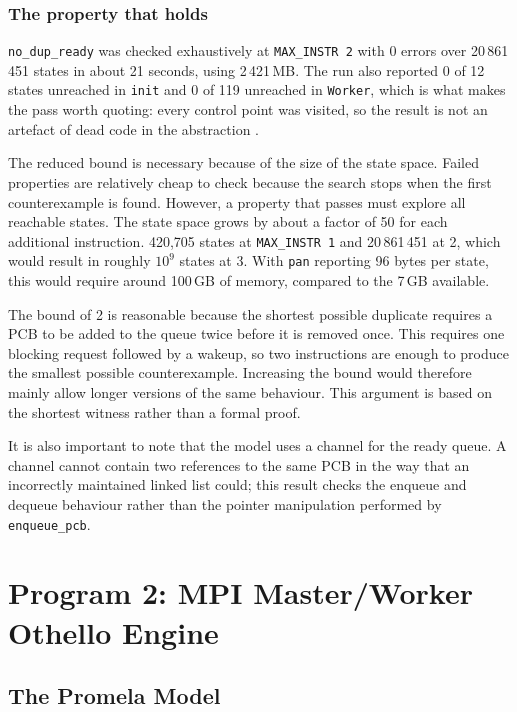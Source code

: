 \documentclass[10pt,a4paper]{article}
\newcommand{\code}[1]{\texttt{#1}}
\begin{document}
\subsubsection*{The property that holds}

\code{no\_dup\_ready} was checked exhaustively at \code{MAX\_INSTR 2} with 0
errors over 20\,861\,451 states in about 21 seconds, using 2\,421\,MB. The run
also reported 0 of 12 states unreached in \code{init} and 0 of 119 unreached
in \code{Worker}, which is what makes the pass worth quoting: every control
point was visited, so the result is not an artefact of dead code in the 
abstraction \cite{inggs_spin}.

The reduced bound is necessary because of the size of the state space. Failed 
properties are relatively cheap to check because the search stops when the 
first counterexample is found. However, a property that passes must explore 
all reachable states. The state space grows by about a factor of 50 for each 
additional instruction. 420,705 states at \code{MAX\_INSTR\ 1} and 
20\,861\,451 at 2, which would result in roughly $10^9$ states at 3. 
With \code{pan} reporting 96 bytes per state, this would require around 
100\,GB of memory, compared to the 7\,GB available.

The bound of 2 is reasonable because the shortest possible duplicate requires 
a PCB to be added to the queue twice before it is removed once. This requires 
one blocking request followed by a wakeup, so two instructions are enough to 
produce the smallest possible counterexample. Increasing the bound would 
therefore mainly allow longer versions of the same behaviour. This argument is 
based on the shortest witness rather than a formal proof.

It is also important to note that the model uses a channel for the ready queue. 
A channel cannot contain two references to the same PCB in the way that an 
incorrectly maintained linked list could; this result checks the 
enqueue and dequeue behaviour rather than the pointer manipulation performed 
by \code{enqueue\_pcb}.


\section{Program 2: MPI Master/Worker Othello Engine}

\subsection{The Promela Model}
\end{document}
